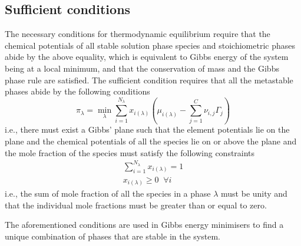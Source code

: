 	\subsection{Sufficient conditions}
    	The necessary conditions for thermodynamic equilibrium require that the chemical potentials of all stable solution phase species and stoichiometric phases abide by the above equality, which is equivalent to Gibbs energy of the system being at a local minimum, and that the conservation of mass and the Gibbs phase rule are satisfied. The sufficient condition requires that all the metastable phases abide by the following conditions
    	\begin{equation*}
        		\pi_{\lambda} = \min_{\lambda} \sum_{i=1}^{N_{\lambda}}x_{i({\lambda})} \left (\mu_{i({\lambda})} - \sum_{j=1}^C \nu_{i,j}\Gamma_j \right )
    	\end{equation*}
    	i.e., there must exist a Gibbs' plane such that the element potentials lie on the plane and the chemical potentials of all the species lie on or above the plane and the mole fraction of the species must satisfy the following constraints
	\begin{equation}
        		\begin{aligned}
            		\sum_{i=1}^{N_{\lambda}}x_{i({\lambda})} = 1 \\
			x_{i({\lambda})} \geq 0 \;\; \forall i
        		\end{aligned}
    	\end{equation}
    	i.e., the sum of mole fraction of all the species in a phase $\lambda$ must be unity and that the individual mole fractions must be greater than or equal to zero.

    	The aforementioned conditions are used in Gibbs energy minimisers to find a unique combination of phases that are stable in the system.
